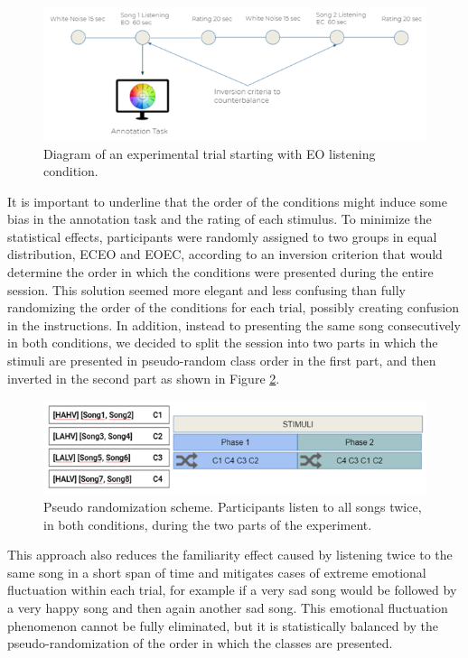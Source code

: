 \begin{figure}[h!]
\includegraphics[width=12cm]{img/methods/experimental_trial.png}
\centering
\caption{Diagram of an experimental trial starting with EO listening condition.} \label{fig_experimental_trial}
\end{figure}

It is important to underline that the order of the conditions might induce some bias in the annotation task and the rating of each stimulus. To minimize the statistical effects, participants were randomly assigned to two groups in equal distribution, ECEO and EOEC, according to an inversion criterion that would determine the order in which the conditions were presented during the entire session. This solution seemed more elegant and less confusing than fully randomizing the order of the conditions for each trial, possibly creating confusion in the instructions. In addition, instead to presenting the same song consecutively in both conditions, we decided to split the session into two parts in which the stimuli are presented in pseudo-random class order in the first part, and then inverted in the second part as shown in Figure \ref{fig_inversion_criterion}.

\begin{figure}[h!]
\includegraphics[width=12cm]{img/methods/inversion_criterion.png}
\centering
\caption{Pseudo randomization scheme. Participants listen to all songs twice, in both conditions, during the two parts of the experiment.} \label{fig_inversion_criterion}
\end{figure}

This approach also reduces the familiarity effect caused by listening twice to the same song in a short span of time and mitigates cases of extreme emotional fluctuation within each trial, for example if a very sad song would be followed by a very happy song and then again another sad song. This emotional fluctuation phenomenon cannot be fully eliminated, but it is statistically balanced by the pseudo-randomization of the order in which the classes are presented. 

